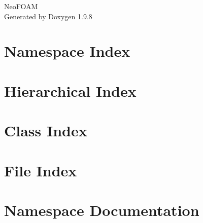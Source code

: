 \documentclass[twoside]{book}
\newcommand{\+}{\discretionary{\mbox{\scriptsize$\hookleftarrow$}}{}{}}
\newcommand{\clearemptydoublepage}{%
    \newpage{\pagestyle{empty}\cleardoublepage}%
  }
\begin{document}
  \raggedbottom
    \hypersetup{pageanchor=false,
                bookmarksnumbered=true,
                pdfencoding=unicode
               }
  \begin{titlepage}
  \vspace*{7cm}
  \begin{center}%
  {\Large Neo\+FOAM}\\
  \vspace*{1cm}
  {\large Generated by Doxygen 1.9.8}\\
  \end{center}
  \end{titlepage}
  \clearemptydoublepage
  \tableofcontents
  \clearemptydoublepage
  \hypersetup{pageanchor=true}
\chapter{Namespace Index}

\chapter{Hierarchical Index}

\chapter{Class Index}

\chapter{File Index}

\chapter{Namespace Documentation}


\end{document}
